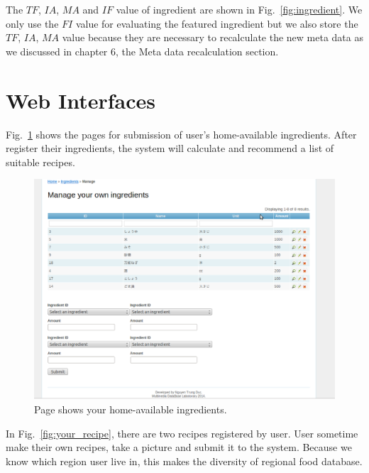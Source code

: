 The $TF$, $IA$, $MA$ and $IF$ value of ingredient are shown in Fig.~\ref{fig:ingredient}. We only use the $FI$ value for evaluating the featured ingredient but we also store the $TF$, $IA$, $MA$ value because they are necessary to recalculate the new meta data as we discussed in chapter 6, the Meta data recalculation section.



\section{Web Interfaces}

Fig.~\ref{fig:your_ingredient} shows the pages for submission of user's home-available ingredients. After register their ingredients, the system will calculate and recommend a list of suitable recipes. 

\begin{figure}
\centering
\includegraphics[scale=0.5]{your_ingredient.eps}
\caption{Page shows your home-available ingredients.}
\label{fig:your_ingredient}
\end{figure}

In Fig.~\ref{fig:your_recipe}, there are two recipes registered by user. User sometime make their own recipes, take a picture and submit it to the system. Because we know which region user live in, this makes the diversity of regional food database.

